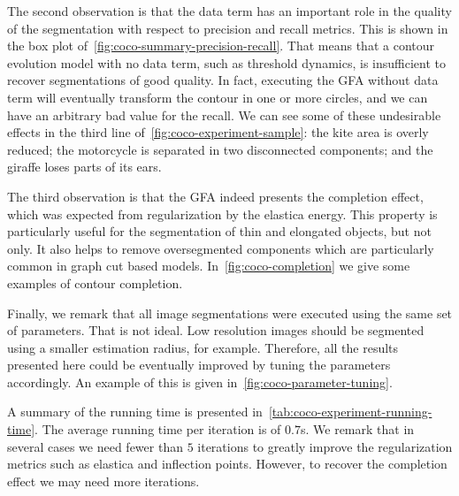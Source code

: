 \documentclass{siamart220329}
\begin{document}
The second observation is that the data term has an important role in the
quality of the segmentation with respect to precision and recall metrics. This
is shown in the box plot of~\cref{fig:coco-summary-precision-recall}. That means
that a contour evolution model with no data term, such as threshold dynamics, is
insufficient to recover segmentations of good quality. In fact, executing the
GFA without data term will eventually transform the contour in one or more
circles, and we can have an arbitrary bad value for the recall. We can see some
of these undesirable effects in the third line
of~\cref{fig:coco-experiment-sample}: the kite area is overly reduced; the
motorcycle is separated in two disconnected components; and the giraffe loses
parts of its ears.

The third observation is that the GFA indeed presents the completion effect,
which was expected from regularization by the elastica energy. This property is
particularly useful for the segmentation of thin and elongated objects, but not
only. It also helps to remove oversegmented components which are particularly
common in graph cut based models. In~\cref{fig:coco-completion} we give some
examples of contour completion.

Finally, we remark that all image segmentations were executed using the same set
of parameters. That is not ideal. Low resolution images should be segmented
using a smaller estimation radius, for example. Therefore, all the results
presented here could be eventually improved by tuning the parameters
accordingly. An example of this is given in~\cref{fig:coco-parameter-tuning}.

A summary of the running time is presented
in~\cref{tab:coco-experiment-running-time}. The average running time per
iteration is of $0.7$s. We remark that in several cases we need fewer than $5$
iterations to greatly improve the regularization metrics such as elastica and
inflection points. However, to recover the completion effect we may need more
iterations.
%
%

\end{document}
